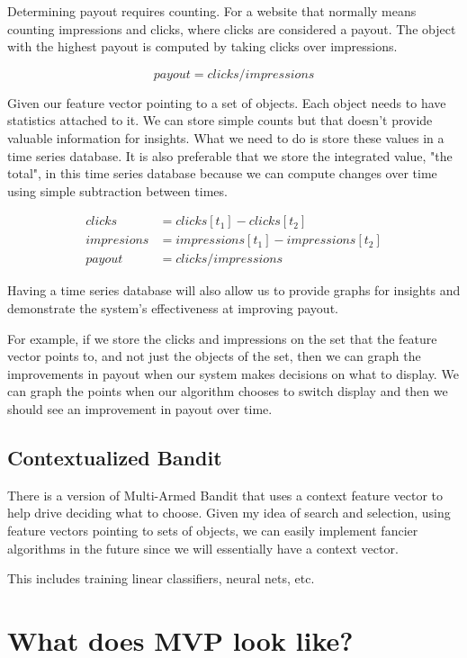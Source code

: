 \documentclass[11pt]{article}
\begin{document}
Determining payout requires counting. For a website that normally means counting
impressions and clicks, where clicks are considered a payout. The object with the
highest payout is computed by taking clicks over impressions.

\begin{equation}
    payout = clicks / impressions
\end{equation}

Given our feature vector pointing to a set of objects. Each object needs to have
statistics attached to it. We can store simple counts but that doesn't provide
valuable information for insights. What we need to do is store these values in a
time series database. It is also preferable that we store the integrated value,
"the total", in this time series database because we can compute changes over time
using simple subtraction between times.

\begin{align*}
    clicks &= clicks[t_1] - clicks[t_2] \\
    impresions &= impressions[t_1] - impressions[t_2] \\
    payout &= clicks / impressions
\end{align*}

Having a time series database will also allow us to provide graphs for insights
and demonstrate the system's effectiveness at improving payout.

For example, if we store the clicks and impressions on the set that the feature
vector points to, and not just the objects of the set, then we can graph the improvements
in payout when our system makes decisions on what to display. We can graph
the points when our algorithm chooses to switch display and then we should see
an improvement in payout over time. 

\subsection{Contextualized Bandit}

There is a version of Multi-Armed Bandit that uses a context feature vector to 
help drive deciding what to choose. Given my idea of search and selection, using
feature vectors pointing to sets of objects, we can easily implement fancier algorithms
in the future since we will essentially have a context vector.

This includes training linear classifiers, neural nets, etc.

\section{What does MVP look like?}
\end{document}
